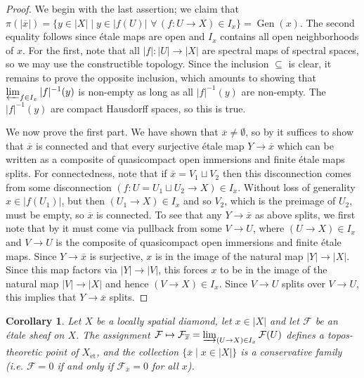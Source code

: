 \documentclass{amsart}
\newtheorem{cor}[subsubsection]{Corollary}
\theoremstyle{remark}
\numberwithin{equation}{subsection}
\newcommand{\cF}{{\mathcal F}}
\DeclareMathOperator{\Gen}{Gen}
\newcommand{\et}{\mathrm{\acute{e}t}}
\newcommand{\ol}{\overline}
\renewcommand{\(}{\left(}
\renewcommand{\)}{\right)}
\begin{document}
\begin{proof}
We begin with the last assertion; we claim that $\pi(|\ol{x}|)=\{y\in |X| \mid y\in |f(U)|\,\, \forall\,(f\colon U \to X) \in I_{x}\}=\Gen(x)$. The second equality follows since \'etale maps are open and $I_{x}$ contains all open neighborhoods of $x$. For the first, note that all $|f| \colon |U| \to |X|$ are spectral maps of spectral spaces, so we may use the constructible topology. Since the inclusion $\subseteq$ is clear, it remains to prove the opposite inclusion, which amounts to showing that $\varprojlim_{f \in I_{x}} |f|^{-1}(y)$ is non-empty as long as all $|f|^{-1}(y)$ are non-empty. The $|f|^{-1}(y)$ are compact Hausdorff spaces, so this is true.

\medskip

We now prove the first part. We have shown that $\ol{x}\neq \emptyset$, so by \cite[Propositions 7.16, 11.26]{diamonds} it suffices to show that $\ol{x}$ is connected and that every surjective \'etale map $Y \to \ol{x}$ which can be written as a composite of quasicompact open immersions and finite \'etale maps splits. For connectedness, note that if $\ol{x}=V_{1} \sqcup V_{2}$ then this disconnection comes from some disconnection $(f \colon U=U_{1} \sqcup U_{2} \to X) \in I_{x}$. Without loss of generality $x\in |f(U_{1})|$, but then $(U_{1} \to X) \in I_{x}$ and so $V_{2}$, which is the preimage of $U_{2}$, must be empty, so $\ol{x}$ is connected. To see that any $Y \to \ol{x}$ as above splits, we first note that by \cite[Proposition 11.23]{diamonds} it must come via pullback from some $V \to U $, where $(U \to X) \in I_{x}$ and $V \to U$ is the composite of quasicompact open immersions and finite \'etale maps. Since $Y \to \ol{x}$ is surjective, $x$ is in the image of the natural map $|Y| \to |X|$. Since this map factors via $|Y| \to |V|$, this forces $x$ to be in the image of the natural map $|V| \to |X|$ and hence $(V \to X) \in I_{x}$. Since $V \to U$ splits over $V \to U$, this implies that $Y \to \ol{x}$ splits.
\end{proof}

\begin{cor}
Let $X$ be a locally spatial diamond, let $x\in |X|$ and let $\cF$ be an \'etale sheaf on $X$. The assignment $\cF \mapsto \cF_{\ol{x}}=\varinjlim_{(U \to X) \in I_{x}} \cF (U)$ defines a topos-theoretic point of $X_{\et}$, and the collection $\{\ol{x} \mid x\in |X| \}$ is a conservative family (i.e. $\cF =0$ if and only if $\cF_{\ol{x}}=0$ for all $x$).
\end{cor}
\end{document}
